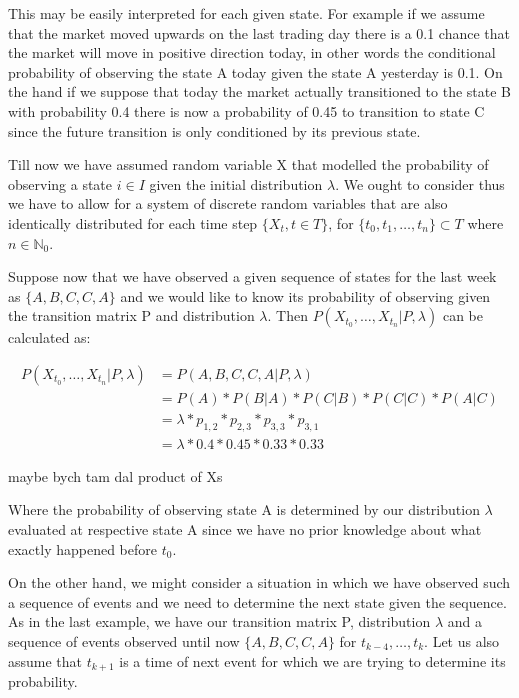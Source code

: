 This may be easily interpreted for each given state. For example if we assume that the market moved upwards on the last trading day there is a 0.1 chance that the market will move in positive direction today, in other words the conditional probability of observing the state A today given the state A yesterday is 0.1. On the hand if we suppose that today the market actually transitioned to the state B  with probability 0.4 there is now a probability of 0.45 to transition to state C since the future transition is only conditioned by its previous state. 

Till now we have assumed random variable X that modelled the probability of observing a state $i \in I$ given the initial distribution $\lambda$. We ought to consider  thus we have to allow for a system of discrete random variables that are also identically distributed for each time step $\{X_{t},t \in T \}$, for $\{t_0,t_1,\ldots,t_n\} \subset T$ where $n \in \mathbb{N}_0$.

Suppose now that we have observed a given sequence of states for the last week as $\{A,B,C,C,A\}$ and we would like to know its probability of observing given the transition matrix P and distribution $\lambda$. Then $P(X_{t_0},\ldots,X_{t_n}|P,\lambda)$ can be calculated as:

\begin{align*}
P(X_{t_0},\ldots,X_{t_n}|P,\lambda) &= P(A,B,C,C,A|P,\lambda) \\
&= P(A) * P(B|A) * P(C|B) * P(C|C) * P(A|C) \\
&= \lambda * p_{1,2} * p_{2,3} * p_{3,3} * p_{3,1} \\
&= \lambda * 0.4 * 0.45 * 0.33 * 0.33
\end{align*}

maybe bych tam dal product of Xs

Where the probability of observing state A is determined by our distribution $\lambda$ evaluated at respective state A since we have no prior knowledge about what exactly happened before $t_0$. 

On the other hand, we might consider a situation in which we have observed such a sequence of events and we need to determine the next state given the sequence. As in the last example, we have our transition matrix P, distribution $\lambda$ and a sequence of events observed until now $\{A,B,C,C,A\}$ for $t_{k-4},\ldots,t_{k}$. Let us also assume that $t_{k+1}$ is a time of next event for which we are trying to determine its probability.

